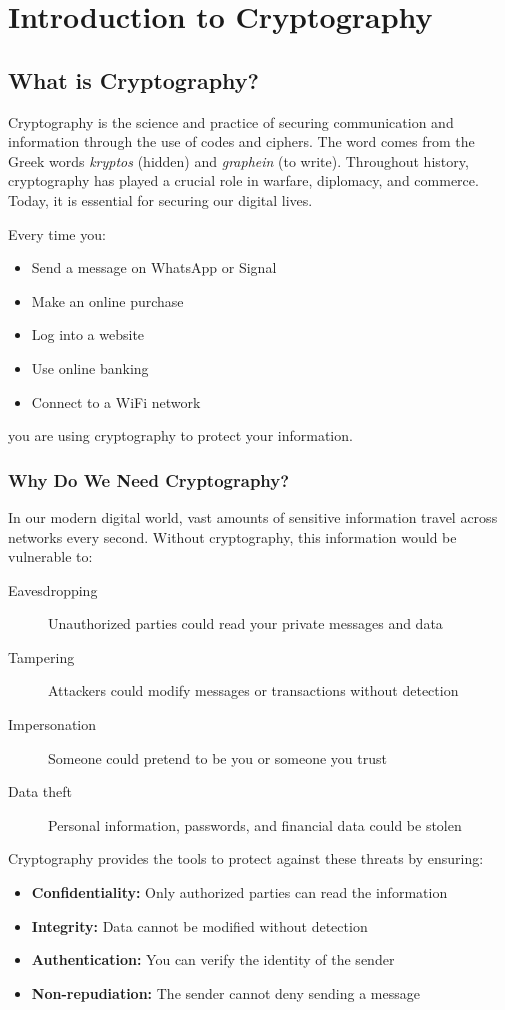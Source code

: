 \documentclass[11pt,a4paper]{report}
\begin{document}
\chapter{Introduction to Cryptography}

\section{What is Cryptography?}

Cryptography is the science and practice of securing communication and information through the use of codes and ciphers. The word comes from the Greek words \emph{kryptos} (hidden) and \emph{graphein} (to write). Throughout history, cryptography has played a crucial role in warfare, diplomacy, and commerce. Today, it is essential for securing our digital lives.

Every time you:
\begin{itemize}
\item Send a message on WhatsApp or Signal
\item Make an online purchase
\item Log into a website
\item Use online banking
\item Connect to a WiFi network
\end{itemize}
you are using cryptography to protect your information.

\subsection{Why Do We Need Cryptography?}

In our modern digital world, vast amounts of sensitive information travel across networks every second. Without cryptography, this information would be vulnerable to:

\begin{description}
\item[Eavesdropping] Unauthorized parties could read your private messages and data
\item[Tampering] Attackers could modify messages or transactions without detection
\item[Impersonation] Someone could pretend to be you or someone you trust
\item[Data theft] Personal information, passwords, and financial data could be stolen
\end{description}

Cryptography provides the tools to protect against these threats by ensuring:
\begin{itemize}
\item \textbf{Confidentiality:} Only authorized parties can read the information
\item \textbf{Integrity:} Data cannot be modified without detection
\item \textbf{Authentication:} You can verify the identity of the sender
\item \textbf{Non-repudiation:} The sender cannot deny sending a message
\end{itemize}
\end{document}
